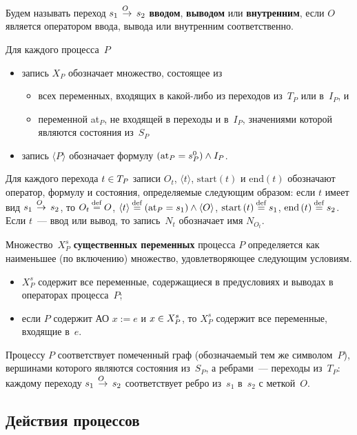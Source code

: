 \begin{multicols}{2}
Будем называть переход $s_1\;\mathop{\to}\limits^{\!\!\!O}\;s_2$ {\bf вводом}, {\bf выводом}
или {\bf внутренним}, если $O$ является оператором ввода, вывода или внутренним
соответственно.

Для каждого процесса~$P$
\begin{itemize}
\item запись $X_P$ обозначает множество,
состоящее из
\begin{itemize}
\item всех переменных, входящих в ка\-кой-ли\-бо из переходов из~$T_P$
или в~$I_P$, и
\item переменной at$_P$, не входящей в переходы
и в~$I_P$, значениями которой являются со\-сто\-яния из~$S_P$
\end{itemize}
\item запись $\langle{P}\rangle$ обозначает
формулу $(\mathrm{at}_P\hm=s^0_P) \wedge I_P$.
\end{itemize}

Для каждого перехода $t\hm\in T_P$
записи $O_t$, $\langle{t}\rangle$, $\mathrm{start}\left(t\right)$ и $\mathrm{end}
\left(t\right)$
 обозначают оператор, формулу и состояния, определяемые следующим образом:
если $t$ имеет вид $s_1\;\mathop{\to}\limits^{\!\!\!O}\;s_2$, то
$O_t\mathbin{{\mathop{=}\limits^{\mathrm{def}}}} O$, $\langle{t}\rangle\mathbin{{\mathop{=}\limits^{\mathrm{def}}}} (\mathrm{at}_P=s_1)\wedge \langle{O}\rangle$,
$\mathrm{start}\left(t\right)\mathbin{{\mathop{=}\limits^{\mathrm{def}}}} s_1$, $\mathrm{end}\left(t\right)\mathbin{{\mathop{=}\limits^{\mathrm{def}}}} s_2$.
Если $t$~--- ввод или вывод, то запись~$N_t$ обозначает имя $N_{O_t}$.

Множество~$X^s_P$ {\bf существенных переменных} процесса
$P$ оп\-ре\-де\-ля\-е\-тся как наименьшее (по включению)
множество, удовлетворяющее следующим условиям.
\begin{itemize}
\item $X^s_P$ содержит все переменные, содержащиеся в предусловиях
и выводах в операторах процесса~$P$;
\item если $P$ содержит АО $x:=e$ и $x\hm\in X^s_P$,
то $X^s_P$  содержит все переменные, входящие в~$e$.
\end{itemize}

Процессу $P$ соответствует помеченный граф (обозначаемый тем же символом~$P$),
вершинами которого являются состояния из~$S_P$,
а ребрами~--- переходы из~$T_P$: каждому переходу $s_1\;\mathop{\to}\limits^{\!\!\!O}\;s_2$
соответствует ребро из~$s_1$ в~$s_2$ с меткой~$O$.

\subsection{Действия процессов}


\end{multicols}
